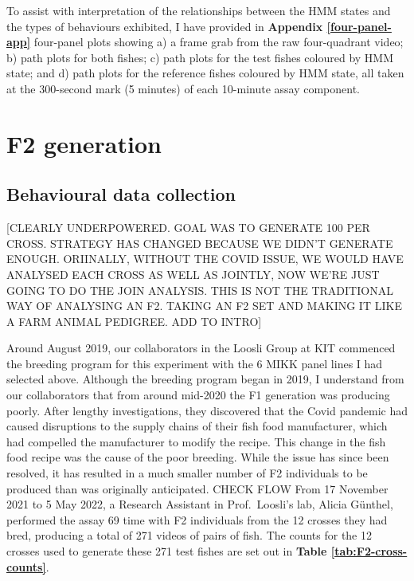 \documentclass[
]{book}
\begin{document}
To assist with interpretation of the relationships between the HMM states and the types of behaviours exhibited, I have provided in \textbf{Appendix \ref{four-panel-app}} four-panel plots showing a) a frame grab from the raw four-quadrant video; b) path plots for both fishes; c) path plots for the test fishes coloured by HMM state; and d) path plots for the reference fishes coloured by HMM state, all taken at the 300-second mark (5 minutes) of each 10-minute assay component.

\clearpage

\hypertarget{f2-generation}{%
\section{F2 generation}\label{f2-generation}}

\hypertarget{behavioural-data-collection}{%
\subsection{Behavioural data collection}\label{behavioural-data-collection}}

{[}CLEARLY UNDERPOWERED. GOAL WAS TO GENERATE 100 PER CROSS. STRATEGY HAS CHANGED BECAUSE WE DIDN'T GENERATE ENOUGH. ORIINALLY, WITHOUT THE COVID ISSUE, WE WOULD HAVE ANALYSED EACH CROSS AS WELL AS JOINTLY, NOW WE'RE JUST GOING TO DO THE JOIN ANALYSIS. THIS IS NOT THE TRADITIONAL WAY OF ANALYSING AN F2. TAKING AN F2 SET AND MAKING IT LIKE A FARM ANIMAL PEDIGREE. ADD TO INTRO{]}

Around August 2019, our collaborators in the Loosli Group at KIT commenced the breeding program for this experiment with the 6 MIKK panel lines I had selected above. Although the breeding program began in 2019, I understand from our collaborators that from around mid-2020 the F1 generation was producing poorly. After lengthy investigations, they discovered that the Covid pandemic had caused disruptions to the supply chains of their fish food manufacturer, which had compelled the manufacturer to modify the recipe. This change in the fish food recipe was the cause of the poor breeding. While the issue has since been resolved, it has resulted in a much smaller number of F2 individuals to be produced than was originally anticipated. CHECK FLOW From 17 November 2021 to 5 May 2022, a Research Assistant in Prof.~Loosli's lab, Alicia Günthel, performed the assay 69 time with F2 individuals from the 12 crosses they had bred, producing a total of 271 videos of pairs of fish. The counts for the 12 crosses used to generate these 271 test fishes are set out in \textbf{Table \ref{tab:F2-cross-counts}}.
\end{document}
